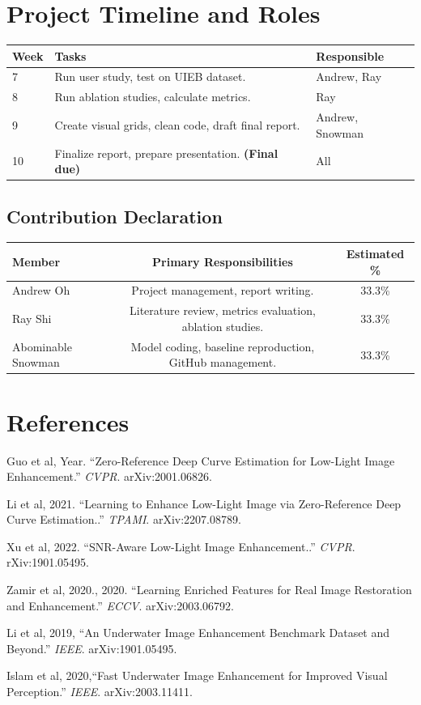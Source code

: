\documentclass[11pt, letterpaper]{article}
\begin{document}
\section{Project Timeline and Roles}

\begin{center}
\begin{tabular}{lp{7cm}l}
\toprule
\textbf{Week} & \textbf{Tasks} & \textbf{Responsible} \\
\midrule
7 & Run user study, test on UIEB dataset. & Andrew, Ray \\
8 & Run ablation studies, calculate metrics. & Ray \\
9 & Create visual grids, clean code, draft final report. & Andrew, Snowman \\
10 & Finalize report, prepare presentation. \textbf{(Final due)} & All \\
\bottomrule
\end{tabular}
\end{center}

\subsection{Contribution Declaration}

\begin{tabular}{lcc}
\toprule
\textbf{Member} & \textbf{Primary Responsibilities} & \textbf{Estimated \%} \\
\midrule
Andrew Oh & Project management, report writing. & 33.3\%  \\
Ray Shi & Literature review, metrics evaluation, ablation studies. & 33.3\%  \\
Abominable Snowman & Model coding, baseline reproduction, GitHub management. & 33.3\%  \\
\bottomrule
\end{tabular}

\section{References}

\begin{enumerate}[label={[\arabic*]},leftmargin=*]
  \item Guo et al, Year. ``Zero-Reference Deep Curve Estimation for Low-Light Image Enhancement.'' \textit{CVPR}. arXiv:2001.06826.
  \item Li et al, 2021. ``Learning to Enhance Low-Light Image via Zero-Reference Deep Curve Estimation..'' \textit{TPAMI}. arXiv:2207.08789.
  \item Xu et al, 2022. ``SNR-Aware Low-Light Image Enhancement..'' \textit{CVPR}. rXiv:1901.05495.
  \item Zamir et al, 2020., 2020. ``Learning Enriched Features for Real Image Restoration and Enhancement.'' \textit{ECCV}. arXiv:2003.06792.
  \item Li et al, 2019, ``An Underwater Image Enhancement Benchmark Dataset and Beyond.'' \textit{IEEE}. arXiv:1901.05495.
  \item Islam et al, 2020,``Fast Underwater Image Enhancement for Improved Visual Perception.'' \textit{IEEE}. arXiv:2003.11411.
\end{enumerate}
\end{document}
